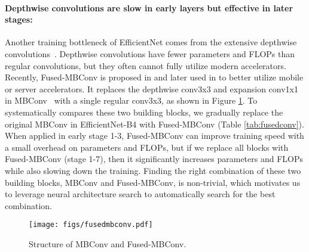 \documentclass{article}
\begin{document}
\paragraph{Depthwise convolutions are slow in early layers but effective in later stages:}
Another training bottleneck of EfficientNet comes from the extensive depthwise convolutions~\cite{sepconv14}. Depthwise convolutions have fewer parameters and FLOPs than regular convolutions, but they often cannot fully utilize modern accelerators. Recently, Fused-MBConv is proposed in \cite{efficientnetedgetpu19} and later used in \cite{automledgetpu20,mobiledet20,efficientnetx21} to better utilize mobile or server accelerators. It replaces the depthwise conv3x3 and expansion conv1x1 in MBConv~\cite{mobilenetv218,efficientnet19} with a single regular conv3x3, as shown in Figure \ref{fig:fusedmbconv}. To systematically compares these two building blocks, we gradually replace the original MBConv in EfficientNet-B4 with Fused-MBConv (Table \ref{tab:fusedconv}). When applied in early stage 1-3, Fused-MBConv can improve training speed with a small overhead on parameters and FLOPs, but if we replace all blocks with Fused-MBConv (stage 1-7), then it significantly increases parameters and FLOPs while also slowing down the training. Finding the right combination of these two building blocks, MBConv and Fused-MBConv, is non-trivial, which motivates us to leverage neural architecture search to automatically search for the best combination.

\begin{figure}[h]
    \centering
    \texttt{[image: figs/fusedmbconv.pdf]}
    \vskip -0.1in
    \caption{Structure of MBConv and Fused-MBConv.}
    \label{fig:fusedmbconv}
    \vskip -0.1in
\end{figure} \begin{table}[!ht]
    \vskip -0.1in
    \caption{Replacing MBConv with Fused-MBConv.  denotes all stages use MBConv,  denotes replacing MBConv with Fused-MBConv in stage \{2, 3, 4\}.
    }
    \centering
\label{tab:fusedconv} 
\end{table} 
\end{document}
